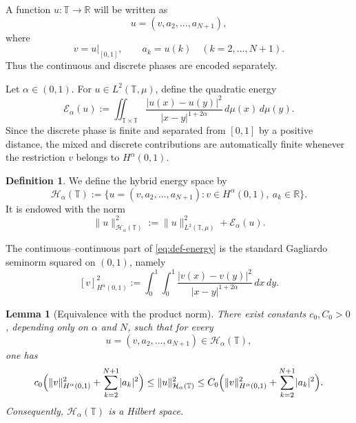 \documentclass[11pt]{article}
\numberwithin{equation}{section}
\newtheorem{lemma}[theorem]{Lemma}
\theoremstyle{definition}
\newtheorem{definition}[theorem]{Definition}
\newcommand{\R}{\mathbb{R}}
\newcommand{\T}{\mathbb{T}}
\newcommand{\EE}{\mathcal{E}}
\newcommand{\HH}{\mathcal{H}}
\newcommand{\abs}[1]{\lvert#1\rvert}
\newcommand{\norm}[1]{\lVert#1\rVert}
\begin{document}
A function $u:\T\to\R$ will be written as
\[
u=(v,a_2,\dots,a_{N+1}),
\]
where
\[
v=u|_{[0,1]},\qquad a_k=u(k)\quad (k=2,\dots,N+1).
\]
Thus the continuous and discrete phases are encoded separately.

Let $\alpha\in(0,1)$. For $u\in L^2(\T,\mu)$, define the quadratic energy
\begin{equation}\label{eq:def-energy}
\EE_\alpha(u):=
\iint_{\T\times\T}
\frac{\abs{u(x)-u(y)}^2}{\abs{x-y}^{1+2\alpha}}
\,d\mu(x)\,d\mu(y).
\end{equation}
Since the discrete phase is finite and separated from $[0,1]$ by a positive distance, the mixed and discrete contributions are automatically finite whenever the restriction $v$ belongs to $H^\alpha(0,1)$.

\begin{definition}
We define the hybrid energy space by
\[
\HH_\alpha(\T):=
\Big\{u=(v,a_2,\dots,a_{N+1}): v\in H^\alpha(0,1),\ a_k\in\R\Big\}.
\]
It is endowed with the norm
\begin{equation}\label{eq:def-Hnorm}
\norm{u}_{\HH_\alpha(\T)}^2:=\norm{u}_{L^2(\T,\mu)}^2+\EE_\alpha(u).
\end{equation}
\end{definition}

The continuous--continuous part of \eqref{eq:def-energy} is the standard Gagliardo seminorm squared on $(0,1)$, namely
\begin{equation}\label{eq:gagliardo-seminorm}
[v]_{H^\alpha(0,1)}^2:=\int_0^1\int_0^1\frac{\abs{v(x)-v(y)}^2}{\abs{x-y}^{1+2\alpha}}\,dx\,dy.
\end{equation}
\begin{lemma}[Equivalence with the product norm]\label{lem:product-norm}
There exist constants $c_0,C_0>0$, depending only on $\alpha$ and $N$, such that for every
\[u=(v,a_2,\dots,a_{N+1})\in \HH_\alpha(\T),
\]
one has
\[
c_0\Bigl(\norm{v}_{H^\alpha(0,1)}^2+\sum_{k=2}^{N+1}\abs{a_k}^2\Bigr)
\le \norm{u}_{\HH_\alpha(\T)}^2
\le C_0\Bigl(\norm{v}_{H^\alpha(0,1)}^2+\sum_{k=2}^{N+1}\abs{a_k}^2\Bigr).
\]
Consequently, $\HH_\alpha(\T)$ is a Hilbert space.
\end{lemma}
\end{document}
